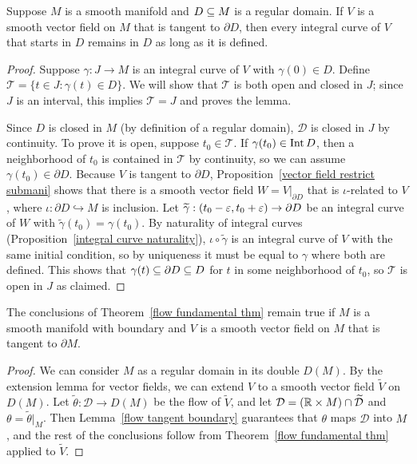 \begin{lemma}\label{flow tangent boundary}
Suppose $M$ is a smooth manifold and $D\subseteq M$ is a regular domain. If $V$ is a smooth vector field on $M$ that is tangent to $\partial D$, then every integral curve of $V$ that starts in $D$ remains in $D$ as long as it is defined.
\end{lemma}
\begin{proof}
Suppose $\gamma:J\to M$ is an integral curve of $V$ with $\gamma(0)\in D$. Define $\mathcal{T}=\{t\in J:\gamma(t)\in D\}$. We will show that $\mathcal{T}$ is both open and closed in $J$; since $J$ is an interval, this implies $\mathcal{T}=J$ and proves the lemma.\par
Since $D$ is closed in $M$ (by definition of a regular domain), $\mathcal{D}$ is closed in $J$ by continuity. To prove it is open, suppose $t_0\in\mathcal{T}$. If $\gamma(t_0)\in\mathrm{Int}\, D$, then a neighborhood of $t_0$ is contained in $\mathcal{T}$ by continuity, so we can assume $\gamma(t_0)\in\partial D$. Because $V$ is tangent to $\partial D$, Proposition~\ref{vector field restrict submani} shows that there is a smooth vector field $W=V|_{\partial D}$ that is $\iota$-related to $V$, where $\iota:\partial D\hookrightarrow M$ is inclusion. Let $\widetilde{\gamma}:(t_0-\varepsilon,t_0+\varepsilon)\to \partial D$ be an integral curve of $W$ with $\widetilde{\gamma}(t_0)=\gamma(t_0)$. By naturality of integral curves (Proposition~\ref{integral curve naturality}), $\iota\circ\widetilde{\gamma}$ is an integral curve of $V$ with the same initial condition, so by uniqueness it must be equal to $\gamma$ where both are defined. This shows that $\gamma(t)\subseteq \partial D\subseteq D$ for $t$ in some neighborhood of $t_0$, so $\mathcal{T}$ is open in $J$ as claimed.
\end{proof}
\begin{theorem}\label{flow boundary}
The conclusions of Theorem~\ref{flow fundamental thm} remain true if $M$ is a smooth manifold with boundary and $V$ is a smooth vector field on $M$ that is tangent to $\partial M$.
\end{theorem}
\begin{proof}
We can consider $M$ as a regular domain in its double $D(M)$. By the extension lemma for vector fields, we can extend $V$ to a smooth vector field $\widetilde{V}$ on $D(M)$. Let $\widetilde{\theta}:\mathcal{D}\to D(M)$ be the flow of $\widetilde{V}$, and let $\mathcal{D}=(\mathbb{R}\times M)\cap \widetilde{\mathcal{D}}$ and $\theta=\widetilde{\theta}|_{M}$. Then Lemma~\ref{flow tangent boundary} guarantees that $\theta$ maps $\mathcal{D}$ into $M$, and the rest of the conclusions follow from Theorem~\ref{flow fundamental thm} applied to $\widetilde{V}$.
\end{proof}
